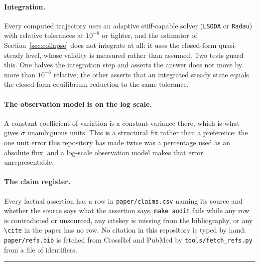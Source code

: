 \paragraph{Integration.} Every computed
trajectory uses an adaptive stiff-capable solver (\texttt{LSODA} or \texttt{Radau}) with
relative tolerances at $10^{-8}$ or tighter, and the estimator of
Section~\ref{sec:collapse} does not integrate at all: it uses the closed-form quasi-steady
level, whose validity is measured rather than assumed. Two tests guard this. One halves the
integration step and asserts the answer does not move by more than $10^{-6}$ relative; the
other asserts that an integrated steady state equals the closed-form equilibrium reduction
to the same tolerance.

\paragraph{The observation model is on the log scale.} A constant coefficient of variation
is a constant variance there, which is what gives $\sigma$ unambiguous units. This is a
structural fix rather than a preference: the one unit error this repository has made twice
was a percentage used as an absolute flux, and a log-scale observation model makes that
error unrepresentable.

\paragraph{The claim register.} Every factual assertion has a row in
\texttt{paper/claims.csv} naming its source and whether the source says what the assertion
says. \texttt{make audit} fails while any row is contradicted or unsourced, any citekey is
missing from the bibliography, or any \texttt{\textbackslash cite} in the paper has no row.
No citation in this repository is typed by hand: \texttt{paper/refs.bib} is fetched from
CrossRef and PubMed by \texttt{tools/fetch\_refs.py} from a file of identifiers.

\vspace{0.5em}
\hrule
\vspace{1em}


